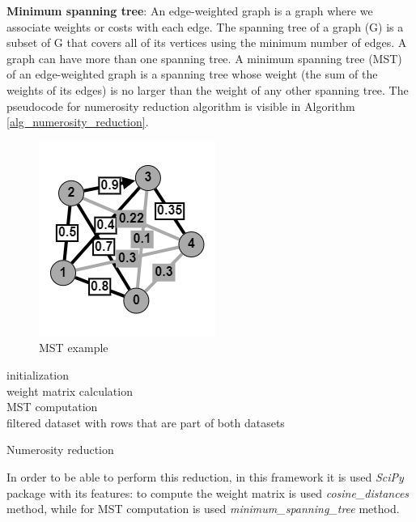 \documentclass[\main/main.tex]{subfiles}
\begin{document}
\textbf{Minimum spanning tree}: An edge-weighted graph is a graph where we associate weights or costs with each edge. The spanning tree of a graph (G) is a subset of G that covers all of its vertices using the minimum number of edges. A graph can have more than one spanning tree. A minimum spanning tree (MST) \cite{books/daglib/0029345} of an edge-weighted graph is a spanning tree whose weight (the sum of the weights of its edges) is no larger than the weight of any other spanning tree. The pseudocode for numerosity reduction algorithm is visible in Algorithm \ref{alg_numerosity_reduction}.
\begin{center}
    \begin{figure}[h]
    \centering
    \includegraphics[scale=1.25]{images/methods/mst_example.png}
    \caption{MST example}
    \label{fig:mst_example}
\end{figure}
\end{center}
\begin{center}
    \begin{algorithm}[H]
     initialization \\
     weight matrix calculation \\
     MST computation \\
     \Return filtered dataset with rows that are part of both datasets
     \caption{Numerosity reduction}
     \label{alg_numerosity_reduction}
    \end{algorithm}
\end{center}
In order to be able to perform this reduction, in this framework it is used \emph{SciPy} \cite{2020SciPyNMeth} package with its features: to compute the weight matrix is used \emph{cosine\_distances} method, while for MST computation is used \emph{minimum\_spanning\_tree} method.
\end{document}
